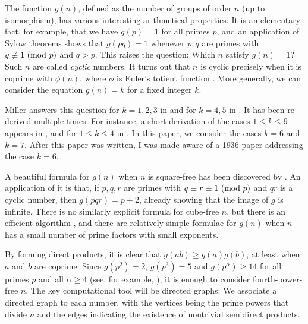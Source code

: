 The function $g(n)$, defined as the number of groups of order $n$ (up to isomorphism), has various interesting arithmetical properties. It is an elementary fact, for example, that we have $g(p) = 1$ for all primes $p$, and an application of Sylow theorems shows that $g(pq) = 1$ whenever $p, q$ are primes with $q \not\equiv 1 \ (\mathrm{mod} \ p)$ and $q > p$. This raises the question: Which $n$ satisfy $g(n) = 1$? Such $n$ are called \emph{cyclic} numbers. It turns out that $n$ is cyclic precisely when it is coprime with $\phi(n)$, where $\phi$ is Euler's totient function {\cite{szele}}. More generally, we can consider the equation $g(n) = k$ for a fixed integer $k$.

Miller answers this question for $k = 1, 2, 3$ in {\cite{miller1}} and for $k = 4, 5$ in {\cite{miller2}}. It has been re-derived multiple times: For instance, a short derivation of the cases $1 \le k \le 9$ appears in {\cite{olsson}}, and for $1 \le k \le 4$ in {\cite{gnumoas}}. In this paper, we consider the cases $k = 6$ and $k = 7$. After this paper was written, I was made aware of a 1936 paper {\cite{sigley}} addressing the case \mbox{$k = 6$.}

A beautiful formula for $g(n)$ when $n$ is square-free has been discovered by  {\cite[Thm.~5.1]{gnumoas}}. An application of it is that, if $p, q, r$ are primes with $q \equiv r \equiv 1 \ (\mathrm{mod} \ p)$ and $qr$ is a cyclic number, then $g(pqr) = p + 2$, already showing that the image of $g$ is infinite. There is no similarly explicit formula for cube-free $n$, but there is an efficient algorithm {\cite{cube-free}}, and there are relatively simple formulae for $g(n)$ when $n$ has a small number of prime factors with small exponents.

By forming direct products, it is clear that $g(ab) \ge g(a)g(b)$, at least when $a$ and $b$ are coprime. Since \mbox{$g(p^2) = 2$,} $g(p^3) = 5$ and $g(p^\alpha) \ge 14$ for all primes $p$ and all $\alpha \ge 4$ (see, for example, \cite[Thm.~3.1]{gnumoas}), it is enough to consider fourth-power-free $n$. The key computational tool will be directed graphs: We associate a directed graph to each number, with the vertices being the prime powers that divide $n$ and the edges indicating the existence of nontrivial semidirect products.
